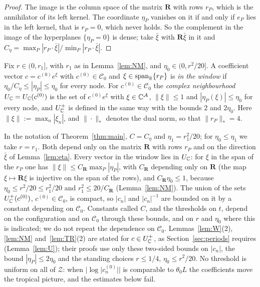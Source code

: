 \begin{proof}
The image is the column space of the matrix $\mathbf R$ with rows $r_P$, which is the annihilator of its left kernel. The
coordinate $\eta_P$ vanishes on it if and only if $e_P$ lies in the left kernel, that is $r_P=0$, which never holds. So
the complement in the image of the hyperplanes $\{\eta_P=0\}$ is dense; take $\bar\xi$ with $\mathbf R\bar\xi$ in it and
$C_\eta=\max_P|r_P\cdot\bar\xi|/\min_P|r_P\cdot\bar\xi|$.
\end{proof}

\begin{definition}\label{def:window}
Fix $r\in(0,r_1]$, with $r_1$ as in Lemma~\ref{lem:NM}, and $\eta_0\in(0,r^2/20]$. A coefficient vector
$c=c^{(0)}e^{\xi}$ with $c^{(0)}\in\mathscr C_0$ and $\xi\in\operatorname{span}_\mathbb R\{r_P\}$ is \emph{in the window} if
$\eta_0/C_\eta\le|\eta_P|\le\eta_0$ for every node. For $c^{(0)}\in\mathscr C_0$ the \emph{complex neighbourhood}
$U_\mathbb C=U_\mathbb C(c^{(0)})$ is the set of $c^{(0)}e^{\xi}$ with $\xi\in\mathbb C^{\mathcal A}$, $\|\xi\|\le1$ and $|\eta_P(\xi)|\le\eta_0$
for every node, and $U^+_\mathbb C$ is defined in the same way with the bounds $2$ and $2\eta_0$. Here $\|\xi\|:=\max_n|\xi_n|$,
and $\|\cdot\|_*$ denotes the dual norm, so that $\|r_P\|_*=4$.
\end{definition}

In the notation of Theorem~\ref{thm:main}, $C=C_\eta$ and $\eta_1=r_1^2/20$; for $\eta_0\le\eta_1$ we take $r=r_1$.
Both depend only on the matrix $\mathbf R$ with rows $r_P$ and on the direction $\bar\xi$ of Lemma~\ref{lem:eta}.
Every vector in the window lies in $U_\mathbb C$: for $\xi$ in the span of the $r_P$ one has $\|\xi\|\le C_{\mathbf R}\max_P|\eta_P|$,
with $C_{\mathbf R}$ depending only on $\mathbf R$ (the map $\xi\mapsto\mathbf R\xi$ is injective on the span of the rows), and $C_{\mathbf R}\eta_0\le1$, because $\eta_0\le r^2/20\le r_1^2/20$ and
$r_1^2\le20/C_{\mathbf R}$ (Lemma~\ref{lem:NM}). The union of the sets $U^+_\mathbb C(c^{(0)})$, $c^{(0)}\in\mathscr C_0$, is compact, so
$|c_n|$ and $|c_n|^{-1}$ are bounded on it by a constant depending on $\mathscr C_0$. Constants called $C$, and the
thresholds on $t$, depend on the configuration and on $\mathscr C_0$ through these bounds, and on $r$ and $\eta_0$ where
this is indicated; we do not repeat the dependence on $\mathscr C_0$. Lemmas~\ref{lem:W}(2), \ref{lem:NM}
and~\ref{lem:TR}(2) are stated for $c\in U^+_\mathbb C$, as Section~\ref{sec:periods} requires (Lemma~\ref{lem:U}); their proofs
use only these two-sided bounds on $|c_n|$, the bound $|\eta_P|\le2\eta_0$ and the standing choices $r\le1/4$,
$\eta_0\le r^2/20$. No threshold is uniform on all of
$\mathcal Z$: when $|\log|c^{(0)}_n||$ is comparable to $\theta_0L$ the coefficients move the tropical picture, and the
estimates below fail.

